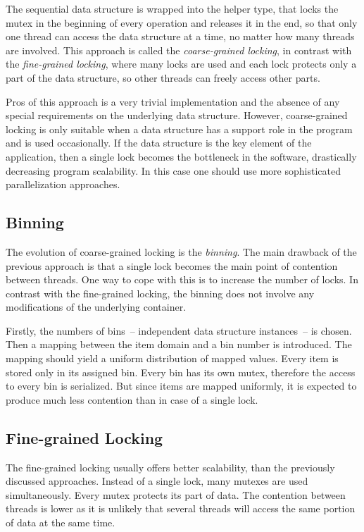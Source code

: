 The sequential data structure is wrapped into the helper type, that locks the mutex in the beginning of every operation and releases it in the end, so that only one thread can access the data structure at a time, no matter how many threads are involved.
This approach is called the \emph{coarse-grained locking}, in contrast with the \emph{fine-grained locking}, where many locks are used and each lock protects only a part of the data structure, so other threads can freely access other parts.

Pros of this approach is a very trivial implementation and the absence of any special requirements on the underlying data structure. However, coarse-grained locking is only suitable when a data structure has a support role in the program and is used occasionally. If the data structure is the key element of the application, then a single lock becomes the bottleneck in the software, drastically decreasing program scalability. In this case one should use more sophisticated parallelization approaches.

\subsection{Binning}
\label{sec:pre_bin}
The evolution of coarse-grained locking is the \emph{binning}. The main drawback of the previous approach is that a single lock becomes the main point of contention between threads. One way to cope with this is to increase the number of locks. In contrast with the fine-grained locking, the binning does not involve any modifications of the underlying container.

Firstly, the numbers of bins~-- independent data structure instances~-- is chosen. Then a mapping between the item domain and a bin number is introduced. The mapping should yield a uniform distribution of mapped values. Every item is stored only in its assigned bin. Every bin has its own mutex, therefore the access to every bin is serialized. But since items are mapped uniformly, it is expected to produce much less contention than in case of a single lock.

\subsection{Fine-grained Locking}

The fine-grained locking usually offers better scalability, than the previously discussed approaches. Instead of a single lock, many mutexes are used simultaneously. Every mutex protects its part of data. The contention between threads is lower as it is unlikely that several threads will access the same portion of data at the same time.

